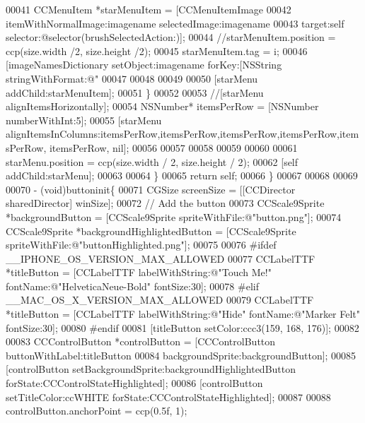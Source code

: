 \begin{DoxyCode}
00041             CCMenuItem *starMenuItem = [CCMenuItemImage
00042                                         itemWithNormalImage:imagename selectedImage:imagename
00043                                         target:self selector:@selector(brushSelectedAction:)];
00044             \textcolor{comment}{//starMenuItem.position = ccp(size.width /2, size.height /2);}
00045             starMenuItem.tag = i;
00046             [imageNamesDictionary setObject:imagename forKey:[NSString stringWithFormat:@"%
00047             
00048             
00049             
00050             [starMenu addChild:starMenuItem];
00051         \}
00052         
00053         \textcolor{comment}{//[starMenu alignItemsHorizontally];}
00054         NSNumber* itemsPerRow = [NSNumber numberWithInt:5];
00055         [starMenu alignItemsInColumns:itemsPerRow,itemsPerRow,itemsPerRow,itemsPerRow,itemsPerRow,
      itemsPerRow, nil];
00056 
00057         
00058         
00059         
00060         
00061         starMenu.position = ccp(size.width / 2, size.height / 2);
00062         [\textcolor{keyword}{self} addChild:starMenu];
00063         
00064     \}
00065     \textcolor{keywordflow}{return} \textcolor{keyword}{self};
00066 \}
00067 
00068 
00069 
00070 - (void)buttoninit\{
00071     CGSize screenSize = [[CCDirector sharedDirector] winSize];
00072     \textcolor{comment}{// Add the button}
00073     CCScale9Sprite *backgroundButton = [CCScale9Sprite spriteWithFile:@"button.png"];
00074     CCScale9Sprite *backgroundHighlightedButton = [CCScale9Sprite spriteWithFile:@"buttonHighlighted.png"];
00075     
00076 \textcolor{preprocessor}{#ifdef \_\_IPHONE\_OS\_VERSION\_MAX\_ALLOWED}
00077 \textcolor{preprocessor}{}    CCLabelTTF *titleButton = [CCLabelTTF labelWithString:@"Touch Me!" fontName:@"HelveticaNeue-Bold" 
      fontSize:30];
00078 \textcolor{preprocessor}{#elif \_\_MAC\_OS\_X\_VERSION\_MAX\_ALLOWED}
00079 \textcolor{preprocessor}{}    CCLabelTTF *titleButton = [CCLabelTTF labelWithString:@"Hide" fontName:@"Marker Felt" fontSize:30];
00080 \textcolor{preprocessor}{#endif}
00081 \textcolor{preprocessor}{}    [titleButton setColor:ccc3(159, 168, 176)];
00082     
00083     CCControlButton *controlButton = [CCControlButton buttonWithLabel:titleButton
00084                                                      backgroundSprite:backgroundButton];
00085     [controlButton setBackgroundSprite:backgroundHighlightedButton forState:CCControlStateHighlighted];
00086     [controlButton setTitleColor:ccWHITE forState:CCControlStateHighlighted];
00087     
00088     controlButton.anchorPoint = ccp(0.5f, 1);

\end{DoxyCode}
